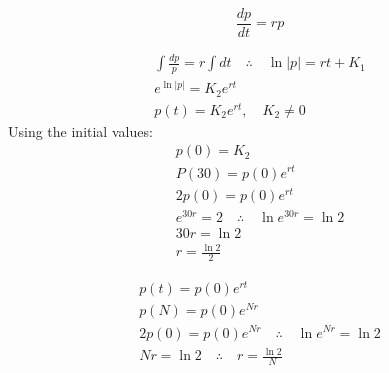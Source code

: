\begin{solution}
	$$\frac{dp}{dt}=rp$$
	\begin{solparts}
		\item
		\begin{gather*}
			\int \frac{dp}{p}=r\int dt \quad \therefore \quad \ln|p|=rt + K_1\\
			e^{\ln|p|}=K_2e^{rt}\\
			p(t)=K_2e^{rt}, \quad K_2 \neq 0
		\end{gather*}
		Using the initial values:
		\begin{gather*}
			p(0)=K_2\\
			P(30)=p(0)e^{rt}\\
			2p(0)=p(0)e^{rt}\\
			e^{30r}=2 \quad \therefore \quad \ln e^{30r}=\ln 2\\
			30r=\ln 2\\
			\boxed{r=\frac{\ln 2}{2}}
		\end{gather*}
		\item
		\begin{gather*}
			p(t)=p(0)e^{rt}\\
			p(N)=p(0)e^{Nr}\\
			2p(0)=p(0)e^{Nr} \quad \therefore \quad \ln e^{Nr}=\ln 2\\
			Nr=\ln 2\quad \therefore \quad \boxed{r=\frac{\ln 2}{N}}
		\end{gather*}
	\end{solparts}
\end{solution}

